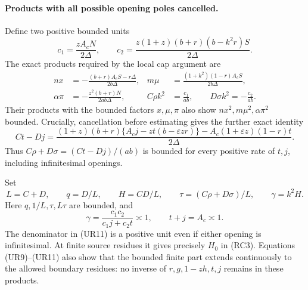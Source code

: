 \paragraph{Products with all possible opening poles cancelled.}
Define two positive bounded units
\[
 c_1=\frac{zA_cN}{2\Delta},\qquad
 c_2=\frac{z(1+z)(b+r)(b-k^2r)S}{2\Delta}.
\]
The exact products required by the local cap argument are
\[
 \begin{aligned}
 nx&=-\frac{(b+r)A_cS-r\Delta}{2b\Delta},&
 m\mu&=\frac{(1+k^2)(1-r)A_cS}{2b\Delta},\\
 \alpha\pi&=-\frac{z^2(b+r)N}{2ab\Delta},&
 C\rho k^2&=\frac{c_1}{ab},\qquad
 D\sigma k^2=-\frac{c_2}{ab}.
 \end{aligned}                                                   \tag{UR9}
 \label{pc3daa35e9a9b:eq:ui-cancelled-products}
\]
Their products with the bounded factors $x,\mu,\pi$ also show
$nx^2,m\mu^2,\alpha\pi^2$ bounded. Crucially, cancellation before
estimating gives the further exact identity
\[
 Ct-Dj=
 \frac{(1+z)(b+r)\{A_cj-zt(b-\varepsilon zr)\}
       -A_c(1+\varepsilon z)(1-r)t}{2\Delta}.          \tag{UR10}
 \label{pc3daa35e9a9b:eq:ui-cancelled-CD-difference}
\]
Thus $C\rho+D\sigma=(Ct-Dj)/(ab)$ is bounded for every positive rate
of $t,j$, including infinitesimal openings.

Set
\[
 L=C+D,\qquad q=D/L,\qquad H=CD/L,\qquad
 \tau=(C\rho+D\sigma)/L,\qquad \gamma=k^2H.
\]
Here $q,1/L,\tau,L\tau$ are bounded, and
\[
 \gamma=\frac{c_1c_2}{c_1j+c_2t}\asymp1,
 \qquad t+j=A_c\asymp1.                              \tag{UR11}
 \label{pc3daa35e9a9b:eq:ui-harmonic-unit}
\]
The denominator in (UR11) is a positive unit even if either opening
is infinitesimal. At finite source residues it gives precisely $H_0$
in (RC3). Equations (UR9)--(UR11) also show that the bounded finite
part extends continuously to the allowed boundary residues: no
inverse of $r,g,1-zh,t,j$ remains in these products.

